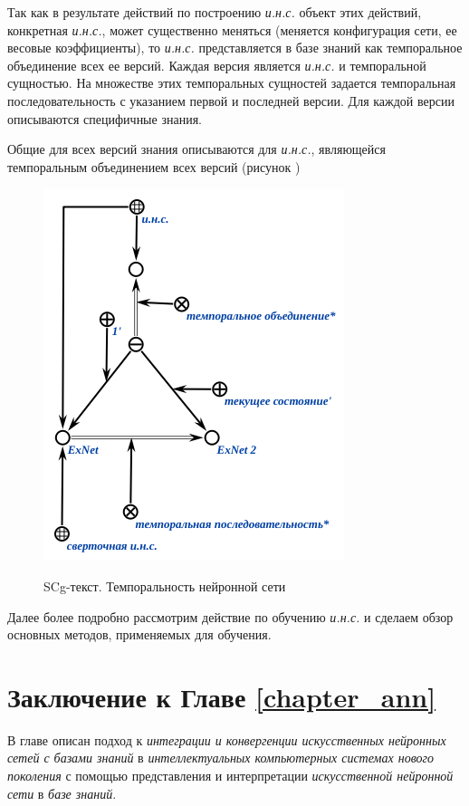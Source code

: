 Так как в результате действий по построению \textit{и.н.с.} объект этих действий, конкретная \textit{и.н.с.}, может существенно меняться (меняется конфигурация сети, ее весовые коэффициенты), то \textit{и.н.с.} представляется в базе знаний как темпоральное объединение всех ее версий. Каждая версия является \textit{и.н.с.} и темпоральной сущностью. На множестве этих темпоральных сущностей задается темпоральная последовательность с указанием первой и последней версии. Для каждой версии описываются специфичные знания.

Общие для всех версий знания описываются для \textit{и.н.с.}, являющейся темпоральным объединением всех версий (рисунок )

\begin{figure}[H]
	\caption{SCg-текст. Темпоральность нейронной сети}
	\includegraphics[scale=0.8]{author/part3/figures/temporal_neural_network_scg.png}
	\label{fig:temporal_neural_network_scg}
\end{figure}

Далее более подробно рассмотрим действие по обучению \textit{и.н.с.} и сделаем обзор основных методов, применяемых для обучения.

\section*{Заключение к Главе \ref{chapter_ann}}
В главе описан подход к \textit{интеграции и конвергенции искусственных нейронных сетей с базами знаний} в \textit{интеллектуальных компьютерных системах нового поколения} с помощью представления и интерпретации \textit{искусственной нейронной сети} в \textit{базе знаний}.


